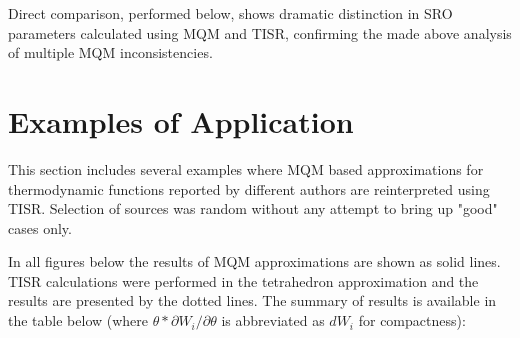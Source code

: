 \documentclass[12pt,abstract]{scrartcl}
\begin{document}
Direct comparison, performed below, shows dramatic distinction in SRO parameters calculated  using MQM and TISR, confirming the made above analysis of multiple MQM inconsistencies.


\section{Examples of Application}

This section includes several examples where MQM based approximations for thermodynamic functions reported by different authors are reinterpreted using TISR. Selection of sources was  random without any attempt to bring up  "good" cases only. 

In  all figures  below the results of MQM  approximations are shown as solid lines. TISR calculations were performed in the tetrahedron approximation and the results are presented by the dotted lines. The summary of results is available  in the table below (where $\theta * {\partial W_i}/{\partial \theta}$ is abbreviated as $dW_i$  for compactness):
\end{document}
